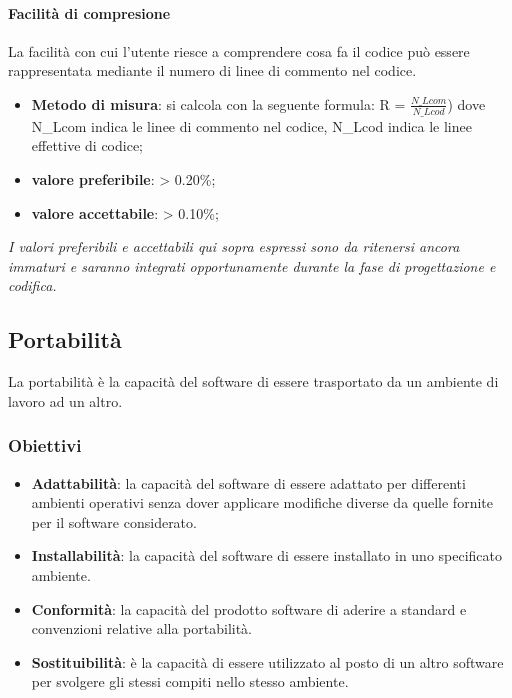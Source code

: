 \paragraph{Facilità di compresione}
La facilità con cui l’utente riesce a comprendere cosa fa il codice può essere rappresentata mediante il numero di linee di commento nel codice.
\begin{itemize}
\item \textbf{Metodo di misura}: si calcola con la seguente formula:
R = $\frac{N\_Lcom}{N\_Lcod}$)
dove N\_Lcom indica le linee di commento nel codice, N\_Lcod indica le linee effettive di codice;
\item \textbf{valore preferibile}: > 0.20\%;
\item \textbf{valore accettabile}: > 0.10\%;
\end{itemize}

\textit{I valori preferibili e accettabili qui sopra espressi sono da ritenersi ancora immaturi e saranno integrati opportunamente durante la fase di progettazione e codifica.}
 
\subsection{Portabilità}
La portabilità è la capacità del software di essere trasportato da un ambiente di lavoro ad un altro. 

\subsubsection{Obiettivi}
\begin{itemize}
\item \textbf{Adattabilità}: la capacità del software di essere adattato per differenti ambienti operativi senza dover applicare modifiche diverse da quelle fornite per il software considerato.
\item \textbf{Installabilità}: la capacità del software di essere installato in uno specificato ambiente.
\item \textbf{Conformità}: la capacità del prodotto software di aderire a standard e convenzioni relative alla portabilità.
\item \textbf{Sostituibilità}: è la capacità di essere utilizzato al posto di un altro software per svolgere gli stessi compiti nello stesso ambiente.
\end{itemize}

 
